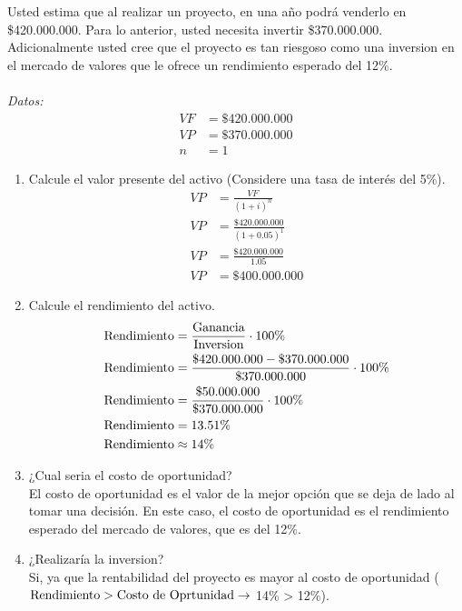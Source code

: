 \documentclass{templateNote}
\begin{document}
\begin{tcolorbox}[colback=blue!10!white,colframe=blue!60!black,title=Ejemplo]
    \noindent Usted estima que al realizar un proyecto, en una año podrá venderlo en \$420.000.000. Para lo anterior, usted necesita invertir \$370.000.000. Adicionalmente usted cree que el proyecto es tan 
    riesgoso como una inversion en el mercado de valores que le ofrece un rendimiento esperado del 12\%. \\\\
    \textit{Datos:}
    \begin{align*}
        VF &= \$420.000.000\\
        VP &= \$370.000.000\\
        n &= 1
    \end{align*}
    \begin{enumerate}
        \item Calcule el valor presente del activo (Considere una tasa de interés del 5\%).
        \begin{align*}
            VP &= \frac{VF}{(1 + i)^n}\\
            VP &= \frac{\$420.000.000}{(1 + 0.05)^1}\\
            VP &= \frac{\$420.000.000}{1.05}\\
            VP &= \$400.000.000
        \end{align*}
        \item Calcule el rendimiento del activo.
        \begin{align*}
            \textnormal{Rendimiento} &= \frac{\textnormal{Ganancia}}{\textnormal{Inversion}} \cdot 100\%\\
            \textnormal{Rendimiento} &= \frac{\$420.000.000 - \$370.000.000}{\$370.000.000} \cdot 100\%\\
            \textnormal{Rendimiento} &= \frac{\$50.000.000}{\$370.000.000} \cdot 100\%\\
            \textnormal{Rendimiento} &= 13.51\%\\
            \textnormal{Rendimiento} &\approx 14\% 
        \end{align*}
        \item ¿Cual seria el costo de oportunidad?\\
        \noindent El costo de oportunidad es el valor de la mejor opción que se deja de lado al tomar una decisión. En este caso, el costo de oportunidad es el rendimiento esperado del mercado de valores, que es del 12\%.
        \item ¿Realizaría la inversion?\\
        \noindent Si, ya que la rentabilidad del proyecto es mayor al costo de oportunidad ($\textnormal{Rendimiento} > \textnormal{Costo de Oprtunidad} \rightarrow $ 14\% > 12\%).
    \end{enumerate}
\end{tcolorbox}
\end{document}
